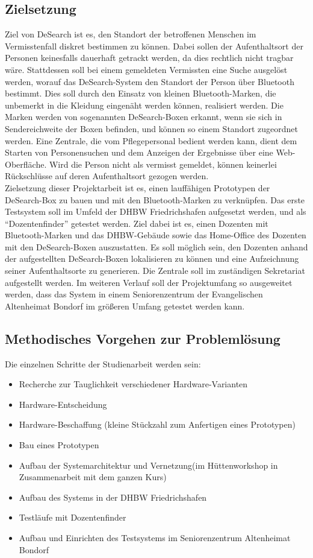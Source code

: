 \subsection{Zielsetzung}
 Ziel von DeSearch ist es, den Standort der betroffenen Menschen im Vermisstenfall diskret bestimmen zu können. Dabei sollen der Aufenthaltsort der Personen keinesfalls dauerhaft getrackt werden, da dies rechtlich nicht tragbar wäre. Stattdessen soll bei einem gemeldeten Vermissten eine Suche ausgelöst werden, worauf das DeSearch-System den Standort der Person über Bluetooth bestimmt. Dies soll durch den Einsatz von kleinen Bluetooth-Marken, die unbemerkt in die Kleidung eingenäht werden können, realisiert werden. Die Marken werden von sogenannten DeSearch-Boxen erkannt, wenn sie sich in Sendereichweite der Boxen befinden, und können so einem Standort zugeordnet werden. Eine Zentrale, die vom Pflegepersonal bedient werden kann, dient dem Starten von Personensuchen und dem Anzeigen der Ergebnisse über eine Web-Oberfläche. Wird die Person nicht als vermisst gemeldet, können keinerlei Rückschlüsse auf deren Aufenthaltsort gezogen werden.
\\Zielsetzung dieser Projektarbeit ist es, einen lauffähigen Prototypen der DeSearch-Box zu bauen und mit den Bluetooth-Marken zu verknüpfen. Das erste Testsystem soll im Umfeld der DHBW Friedrichshafen aufgesetzt werden, und als “Dozentenfinder” getestet werden. Ziel dabei ist es, einen Dozenten mit Bluetooth-Marken und das DHBW-Gebäude sowie das Home-Office des Dozenten mit den DeSearch-Boxen auszustatten. Es soll möglich sein, den Dozenten anhand der aufgestellten DeSearch-Boxen lokalisieren zu können und eine Aufzeichnung seiner Aufenthaltsorte zu generieren. Die Zentrale soll im zuständigen Sekretariat aufgestellt werden.
Im weiteren Verlauf soll der Projektumfang so ausgeweitet werden, dass das System in einem Seniorenzentrum der Evangelischen Altenheimat Bondorf im größeren Umfang getestet werden kann.

\subsection{Methodisches Vorgehen zur Problemlösung}
Die einzelnen Schritte der Studienarbeit werden sein:
\begin{itemize}
\item Recherche zur Tauglichkeit verschiedener Hardware-Varianten
\item Hardware-Entscheidung
\item Hardware-Beschaffung (kleine Stückzahl zum Anfertigen eines Prototypen)
\item Bau eines Prototypen
\item Aufbau der Systemarchitektur und Vernetzung(im Hüttenworkshop in Zusammenarbeit mit dem ganzen Kurs)
\item Aufbau des Systems in der DHBW Friedrichshafen
\item Testläufe mit Dozentenfinder
\item Aufbau und Einrichten des Testsystems im Seniorenzentrum Altenheimat Bondorf
\end{itemize}



